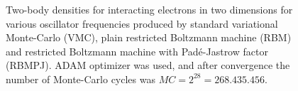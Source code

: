 \begin{landscape}
\begin{figure} [H]
		
		\caption{Two-body densities for interacting electrons in two dimensions for various oscillator frequencies produced by standard variational Monte-Carlo (VMC), plain restricted Boltzmann machine (RBM) and restricted Boltzmann machine with Padé-Jastrow factor (RBMPJ). ADAM optimizer was used, and after convergence the number of Monte-Carlo cycles was $MC=2^{28}=268.435.456$.}%
		\label{fig:TB_interaction_2D_3}
	\end{figure}
	

\end{landscape}
